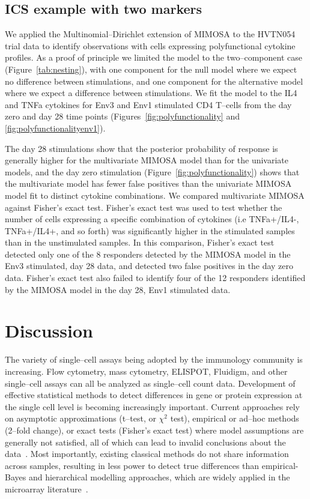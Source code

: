 \documentclass[11pt]{article}
\begin{document}
\subsection{ICS example with two markers}
We applied the Multinomial--Dirichlet extension of MIMOSA to the HVTN054 trial data to identify observations with cells expressing polyfunctional cytokine profiles. As a proof of principle we limited the model to the two--component case (Figure~\ref{tab:nesting}), with one component for the null model where we expect no difference between stimulations, and one component for the alternative model where we expect a difference between stimulations. We fit the model to the IL4 and TNFa cytokines for Env3 and Env1 stimulated CD4 T--cells from the day zero and day 28 time points (Figures~\ref{fig:polyfunctionality} and \ref{fig:polyfunctionalityenv1}). 

The day 28 stimulations show that the posterior probability of response is generally higher for the multivariate MIMOSA model than for the univariate models, and the day zero stimulation (Figure~\ref{fig:polyfunctionality}) shows that the multivariate model has fewer false positives than the univariate MIMOSA model fit to distinct cytokine combinations. We compared multivariate MIMOSA against Fisher's exact test. Fisher's exact test was used to test whether the number of cells expressing a specific combination of cytokines (i.e TNFa+/IL4-, TNFa+/IL4+, and so forth) was significantly higher in the stimulated samples than in the unstimulated samples.  In this comparison, Fisher's exact test detected only one of the 8 responders detected by the MIMOSA model in the Env3 stimulated, day 28 data, and detected two false positives in the day zero data. Fisher's exact test also failed to identify four of the 12 responders identified by the MIMOSA model in the day 28, Env1 stimulated data.


\section{Discussion}
The variety of single--cell assays being adopted by the immunology community is increasing. Flow cytometry, mass cytometry, ELISPOT, Fluidigm, and other single--cell assays can all be analyzed as single--cell count data. Development of effective statistical methods to detect differences in gene or protein expression at the single cell level is becoming increasingly important. Current approaches rely on asymptotic approximations (t--test, or $\chi^2$ test), empirical or ad--hoc methods (2--fold change), or exact tests (Fisher's exact test) where model assumptions are generally not satisfied, all of which can lead to invalid conclusions about the data~\cite{Dittrich:2012bv,Trigona:2003,Sinclair:2004hs,Horton:2007tsa,Proschan:2009ks}. Most importantly, existing classical methods do not share information across samples, resulting in less power to detect true differences than empirical-Bayes and hierarchical modelling approaches, which are widely applied in the microarray literature~\cite{Kendziorski:2003uw,Newton:2001go,Smyth:2005iy}. 
\end{document}
